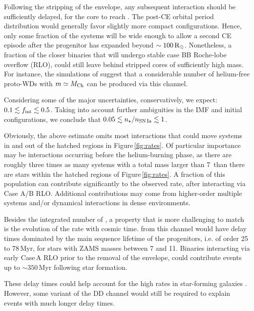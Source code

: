 \documentclass[../../main/thesis_msc.tex]{subfiles}
\begin{document}
Following the stripping of the envelope, any 
subsequent interaction should be sufficiently delayed, for the core to reach \mch. The post-CE orbital period distribution would generally favor slightly more compact configurations. Hence, only some fraction of the systems will be wide enough to allow 
 a second CE episode after the progenitor has expanded beyond $\sim 100\mathrm{\,R_\odot}$. 
Nonetheless, a fraction of the closer binaries that will undergo stable case BB Roche-lobe 
overflow (RLO), could still leave behind stripped \one cores of sufficiently high mass. For instance, the
 simulations of \cite{Tauris:2015xra} suggest that   a considerable number of helium-free \one proto-WDs 
with $m\simeq M_{\mathrm{Ch}}$ can be produced via this channel. 

Considering some of the major uncertainties, conservatively, we expect: $0.1 \lesssim f_{\rm int}\lesssim 0.5$. 
Taking into account further ambiguities in the IMF and initial configurations, we conclude 
that $0.05\lesssim n_\star / n_{\rm SN\,Ia} \lesssim 1$. 

Obviously, the above estimate omits most interactions that could move systems in and out of the hatched regions in 
Figure\,\ref{fig:rates}. Of particular importance may be interactions 
occurring before the helium-burning phase, as there are  
roughly three times as many systems with a total mass larger than 7\msun\  
than there are stars within the hatched regions of Figure\,\ref{fig:rates}. 
A fraction of this population can contribute significantly to the observed rate, after interacting via Case A/B RLO. 
Additional contributions may come from higher-order multiple systems and/or dynamical interactions in dense environments.  


Besides the integrated number of \ias, a property that is more challenging to match is the evolution of the \ia rate with cosmic time. \ias from this channel would have delay times dominated by the main sequence lifetime of the progenitors, i.e. of order 25 to 78\,Myr, for stars with ZAMS masses between 7 and 11\msun. Binaries interacting via early Case\,A RLO prior to the removal of the envelope, could contribute events up to $\sim 350$\,Myr following star formation. 

These delay times could help account for the high \ia rates in star-forming galaxies \citep{Maoz:2010pz,claeys2014}. 
However, some variant of the DD channel would still be required to explain events with much longer delay times.  
\end{document}
